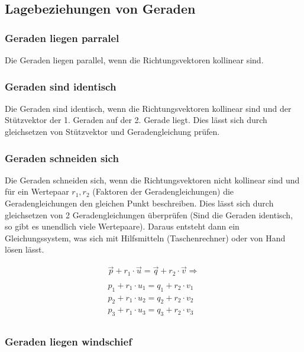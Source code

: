 \subsection{Lagebeziehungen von Geraden}
\subsubsection*{Geraden liegen parralel}

Die Geraden liegen parallel, wenn die Richtungsvektoren kollinear sind.

\subsubsection*{Geraden sind identisch}

Die Geraden sind identisch, wenn die Richtungsvektoren kollinear sind und
der Stützvektor der 1. Geraden auf der 2. Gerade liegt.
Dies lässt sich durch gleichsetzen von Stützvektor und Geradengleichung prüfen.

\subsubsection*{Geraden schneiden sich}

Die Geraden schneiden sich, wenn die Richtungsvektoren nicht kollinear sind
und für ein Wertepaar $r_1, r_2$ (Faktoren der Geradengleichungen) die Geradengleichungen
den gleichen Punkt beschreiben. Dies lässt sich durch gleichsetzen von 2 Geradengleichungen
überprüfen (Sind die Geraden identisch, so gibt es unendlich viele Wertepaare).
Daraus entsteht dann ein Gleichungssystem, was sich mit Hilfsmitteln (Taschenrechner)
oder von Hand lösen lässt.

\begin{align*}
    \vec{p} + r_1 \cdot \vec{u} = \vec{q} + r_2 \cdot \vec{v} \Rightarrow \\
    \\
    p_1 + r_1 \cdot u_1 = q_1 + r_2 \cdot v_1 \\
    p_2 + r_1 \cdot u_2 = q_2 + r_2 \cdot v_2 \\
    p_3 + r_1 \cdot u_3 = q_3 + r_2 \cdot v_3 \\
\end{align*}

\subsubsection*{Geraden liegen windschief}

